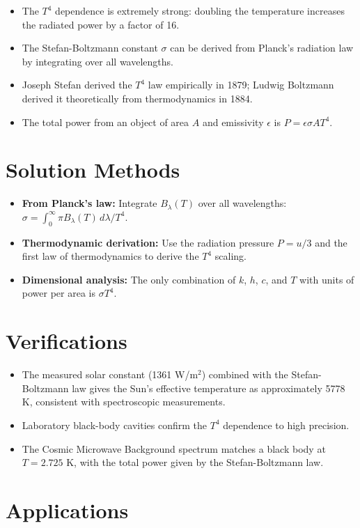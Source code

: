 \begin{itemize}
    \item The $T^4$ dependence is extremely strong: doubling the temperature increases the radiated power by a factor of 16.
    \item The Stefan-Boltzmann constant $\sigma$ can be derived from Planck's radiation law by integrating over all wavelengths.
    \item Joseph Stefan derived the $T^4$ law empirically in 1879; Ludwig Boltzmann derived it theoretically from thermodynamics in 1884.
    \item The total power from an object of area $A$ and emissivity $\epsilon$ is $P = \epsilon\sigma A T^4$.
\end{itemize}
\section*{Solution Methods}

\begin{itemize}
    \item \textbf{From Planck's law:} Integrate $B_\lambda(T)$ over all wavelengths: $\sigma = \int_0^\infty \pi B_\lambda(T)\,d\lambda / T^4$.
    \item \textbf{Thermodynamic derivation:} Use the radiation pressure $P = u/3$ and the first law of thermodynamics to derive the $T^4$ scaling.
    \item \textbf{Dimensional analysis:} The only combination of $k$, $h$, $c$, and $T$ with units of power per area is $\sigma T^4$.
\end{itemize}
\section*{Verifications}

\begin{itemize}
    \item The measured solar constant (1361 W/m$^2$) combined with the Stefan-Boltzmann law gives the Sun's effective temperature as approximately 5778 K, consistent with spectroscopic measurements.
    \item Laboratory black-body cavities confirm the $T^4$ dependence to high precision.
    \item The Cosmic Microwave Background spectrum matches a black body at $T = 2.725$ K, with the total power given by the Stefan-Boltzmann law.
\end{itemize}
\section*{Applications}

